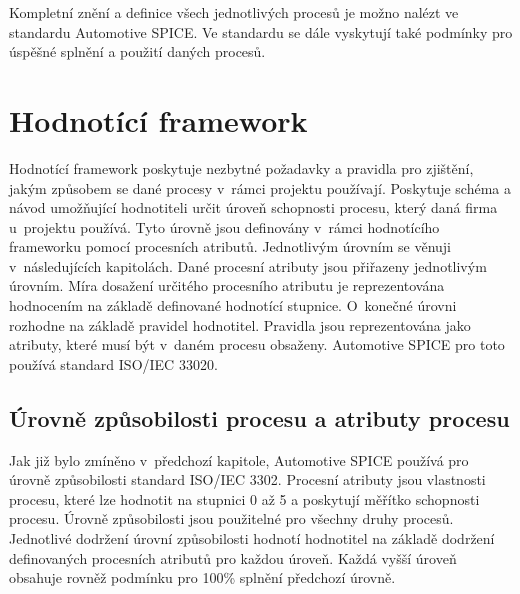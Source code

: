\documentclass[czech,master]{diploma}
\begin{document}
Kompletní znění a definice všech jednotlivých procesů je možno nalézt ve standardu Automotive SPICE. \cite{ref:aspice_procesy} Ve standardu se dále vyskytují také podmínky pro úspěšné splnění a použití daných procesů.


\section{Hodnotící framework}
Hodnotící framework poskytuje nezbytné požadavky a pravidla pro zjištění, jakým způsobem se dané procesy v~rámci projektu používají. Poskytuje schéma a návod umožňující hodnotiteli určit úroveň schopnosti procesu, který daná firma u~projektu používá. Tyto úrovně jsou definovány v~rámci hodnotícího frameworku pomocí procesních atributů. Jednotlivým úrovním se věnuji v~následujících kapitolách. Dané procesní atributy jsou přiřazeny jednotlivým úrovním. Míra dosažení určitého procesního atributu je reprezentována hodnocením na základě definované hodnotící stupnice. O~konečné úrovni rozhodne na základě pravidel hodnotitel. Pravidla jsou reprezentována jako atributy, které musí být v~daném procesu obsaženy. Automotive SPICE pro toto používá standard ISO/IEC 33020. \cite{ref:aspice_download_1523}

\subsection{Úrovně způsobilosti procesu a atributy procesu}
Jak již bylo zmíněno v~předchozí kapitole, Automotive SPICE používá pro úrovně způsobilosti standard ISO/IEC 3302. Procesní atributy jsou vlastnosti procesu, které lze hodnotit na stupnici 0 až 5 a poskytují měřítko schopnosti procesu. Úrovně způsobilosti jsou použitelné pro všechny druhy procesů. Jednotlivé dodržení úrovní způsobilosti hodnotí hodnotitel na základě dodržení definovaných procesních atributů pro každou úroveň. Každá vyšší úroveň obsahuje rovněž podmínku pro 100\% splnění předchozí úrovně.
\end{document}

